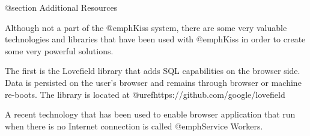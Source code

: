 @section Additional Resources

Although not a part of the @emph{Kiss} system, there are some very valuable technologies and libraries that
have been used with @emph{Kiss} in order to create some very powerful solutions.

The first is the Lovefield library that adds SQL capabilities on the browser side.  Data is persisted on the user's browser
and remains through browser or machine re-boots.  The library is located at @uref{https://github.com/google/lovefield}

A recent technology that has been used to enable browser application that run when there is no Internet connection
is called @emph{Service Workers}.

